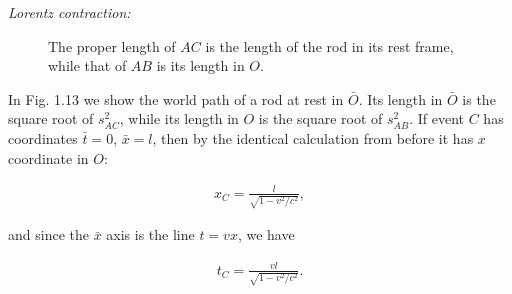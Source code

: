 \documentclass[11pt,letterpaper]{book}
\begin{document}
        \textit{Lorentz contraction:}
        \begin{figure}[h!]
        \centering
        \caption{The proper length of \( AC \) is the length of the rod in its rest frame, while that of \( AB \) is its length in \( O \).}
        \end{figure}

        In Fig. 1.13 we show the world path of a rod at rest in \( \bar{O} \). Its length in \( \bar{O} \) is the square root of \( s^2_{AC} \), while its length in \( O \) is the square root of \( s^2_{AB} \). If event \( C \) has coordinates \( \bar{t} = 0 \), \( \bar{x} = l \), then by the identical calculation from before it has \( x \) coordinate in \( O \):
        
        \begin{align}
        x_C = \frac{l}{\sqrt{1 - v^2/c^2}},
        \end{align}
        
        and since the \( \bar{x} \) axis is the line \( t = vx \), we have
        
        \begin{align}
        t_C = \frac{vl}{\sqrt{1 - v^2/c^2}}.
        \end{align}
        
\end{document}
